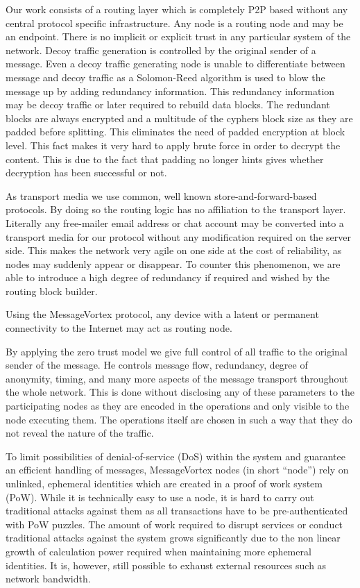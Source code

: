 \documentclass[9pt,journal,compsoc]{IEEEtran}
\begin{document}
Our work consists of a routing layer which is completely P2P based without any central protocol specific infrastructure. Any node is a routing node and may be an endpoint. There is no implicit or explicit trust in any particular system of the  network. Decoy traffic generation is controlled by the original sender of a message. Even a decoy traffic generating node is unable to differentiate between message and decoy traffic as a Solomon-Reed algorithm is used to blow the message up by adding redundancy information. This redundancy information may be decoy traffic or later required to rebuild data blocks. The redundant blocks are always encrypted and a multitude of the cyphers block size as they are padded before splitting. This eliminates the need of padded encryption at block level. This fact makes it very hard to apply brute force in order to decrypt the content. This is due to the fact  that padding no longer hints gives whether decryption has been successful or not.

As transport media we use common, well known store-and-forward-based protocols. By doing so the routing logic has no affiliation to the transport layer. Literally any free-mailer email address or chat account may be converted into a transport media for our protocol without any modification required on the server side. This makes the network very agile on one side at the cost of reliability, as nodes may suddenly appear or disappear. To counter this phenomenon, we are able to introduce a high degree of redundancy if required and wished by the routing block builder.

Using the MessageVortex protocol, any device with a latent or permanent connectivity to the Internet may act as routing node. 

By applying the zero trust model we give full control of all traffic to the original sender of the message. He controls message flow, redundancy, degree of anonymity, timing, and many more aspects of the message transport throughout the whole network. This is done without disclosing any of these parameters to the participating nodes as they are encoded in the operations and only visible to the node executing them. The operations itself are chosen in such a way that they do not reveal the nature of the traffic.

To limit possibilities of denial-of-service (DoS) within the system and guarantee an efficient handling of messages, MessageVortex nodes (in short ``node'') rely on unlinked, ephemeral identities which are created in a proof of work system (PoW). While it is technically easy to use a node, it is hard to carry out traditional attacks against them as all transactions have to be pre-authenticated with PoW puzzles. The amount of work required to disrupt services or conduct traditional attacks against the system grows significantly due to the non linear growth of calculation power required when maintaining more ephemeral identities. It is, however, still possible to exhaust external resources such as network bandwidth.\par\nopagebreak
\end{document}

